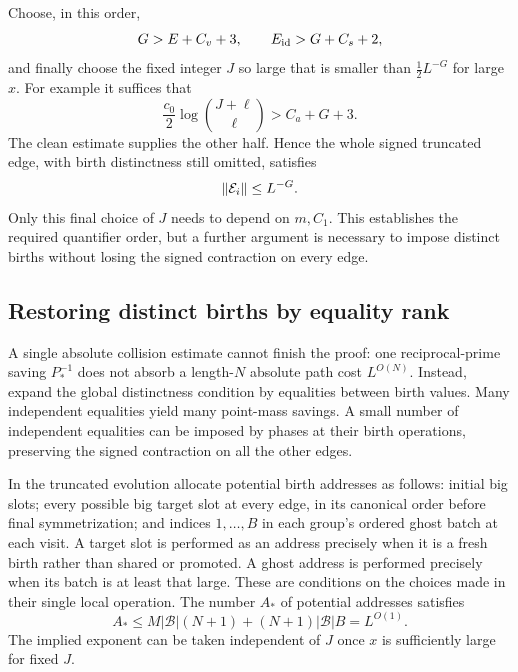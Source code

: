 Choose, in this order,
\begin{equation}\label{eq:transference-parameter-choice}
 G>E+C_v+3,\qquad E_{\rm id}>G+C_s+2,
\end{equation}
and finally choose the fixed integer $J$ so large that
 is smaller than
$\tfrac12L^{-G}$ for large $x$.  For example it suffices
that
\[
 \frac{c_0}{2}\log\binom{J+\ell}{\ell}>C_a+G+3.
\]
The clean estimate supplies the other half.  Hence the
whole signed truncated edge, with birth distinctness
still omitted, satisfies
\begin{equation}\label{eq:whole-edge-contraction}
 \lVert \mathcal E_i\rVert\le L^{-G}.
\end{equation}
Only this final choice of $J$ needs to depend on $m,C_1$.
This establishes the required quantifier order, but a
further argument is necessary to impose distinct births
without losing the signed contraction on every edge.

\subsection{Restoring distinct births by equality rank}

A single absolute collision estimate cannot finish the proof: one
reciprocal-prime saving $P_*^{-1}$ does not absorb a length-$N$ absolute
path cost $L^{O(N)}$.  Instead, expand the global distinctness condition
by equalities between birth values.  Many independent equalities yield
many point-mass savings.  A small number of independent equalities can
be imposed by phases at their birth operations, preserving the signed
contraction on all the other edges.

In the truncated evolution allocate potential birth
addresses as follows: initial big slots; every possible
big target slot at every edge, in its canonical order
before final symmetrization; and indices $1,\ldots,B$
in each group's ordered ghost batch at each visit.
A target slot is performed as an address precisely when
it is a fresh birth rather than shared or promoted.
A ghost address is performed precisely when its batch
is at least that large.  These are conditions on the
choices made in their single local operation.  The
number $A_*$ of potential addresses satisfies
\begin{equation}\label{eq:birth-address-count}
 A_*\le M|\mathcal B|(N+1)+(N+1)|\mathcal B|B=L^{O(1)}.
\end{equation}
The implied exponent can be taken independent of $J$
once $x$ is sufficiently large for fixed $J$.


